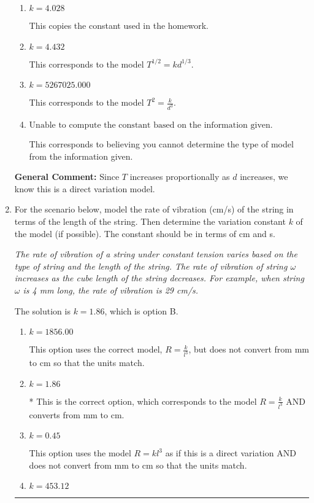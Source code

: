 \documentclass{extbook}[14pt]
\newcommand{\litem}[1]{\item #1

\rule{\textwidth}{0.4pt}}
\begin{document}
\begin{enumerate}
{\begin{enumerate}[label=\Alph*.]
* This is the correct option corresponding to the model $T^{2} = k d^{3}$.
\item \( k = 4.028 \)

This copies the constant used in the homework.
\item \( k = 4.432 \)

This corresponds to the model $T^{1/2} = k d^{1/3}$.
\item \( k = 5267025.000 \)

This corresponds to the model $T^{2} = \frac{k}{d^{3}}$.
\item \( \text{Unable to compute the constant based on the information given.} \)

This corresponds to believing you cannot determine the type of model from the information given.
\end{enumerate}

\textbf{General Comment:} Since $T$ increases proportionally as $d$ increases, we know this is a direct variation model.
}
\litem{
For the scenario below, model the rate of vibration (cm/s) of the string in terms of the length of the string. Then determine the variation constant $k$ of the model (if possible). The constant should be in terms of cm and s.

\begin{center}
    \textit{ The rate of vibration of a string under constant tension varies based on the type of string and the length of the string. The rate of vibration of string $\omega$ increases as the cube length of the string decreases. For example, when string $\omega$ is 4 mm long, the rate of vibration is 29 cm/s. }
\end{center}
The solution is \( k = 1.86 \), which is option B.\begin{enumerate}[label=\Alph*.]
\item \( k = 1856.00 \)

This option uses the correct model, $R = \frac{k}{l^{3}}$, but does not convert from mm to cm so that the units match.
\item \( k = 1.86 \)

* This is the correct option, which corresponds to the model $R = \frac{k}{l^{3}}$ AND converts from mm to cm.
\item \( k = 0.45 \)

This option uses the model $R = kl^{3}$ as if this is a direct variation AND does not convert from mm to cm so that the units match.
\item \( k = 453.12 \)


\end{enumerate}}
\end{enumerate}
\end{document}
